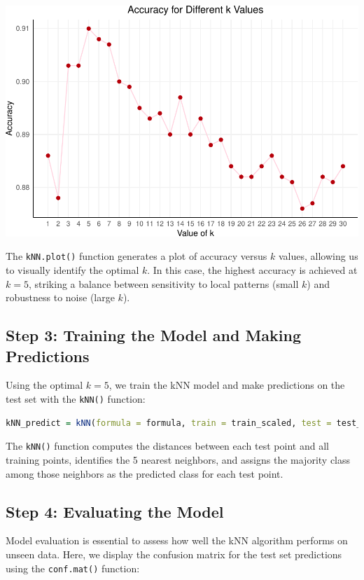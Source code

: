 \documentclass[
]{book}
\newcommand{\passthrough}[1]{#1}
\theoremstyle{definition}
\theoremstyle{definition}
\theoremstyle{definition}
\theoremstyle{definition}
\theoremstyle{remark}
\begin{document}
\begin{center}\includegraphics[width=0.7\linewidth]{knn_files/figure-latex/unnamed-chunk-8-1} \end{center}

The \passthrough{\lstinline!kNN.plot()!} function generates a plot of accuracy versus \(k\) values, allowing us to visually identify the optimal \(k\). In this case, the highest accuracy is achieved at \(k = 5\), striking a balance between sensitivity to local patterns (small \(k\)) and robustness to noise (large \(k\)).

\subsection{Step 3: Training the Model and Making Predictions}\label{step-3-training-the-model-and-making-predictions}

Using the optimal \(k = 5\), we train the kNN model and make predictions on the test set with the \passthrough{\lstinline!kNN()!} function:

\begin{lstlisting}[language=R]
kNN_predict = kNN(formula = formula, train = train_scaled, test = test_scaled, k = 5)
\end{lstlisting}

The \passthrough{\lstinline!kNN()!} function computes the distances between each test point and all training points, identifies the 5 nearest neighbors, and assigns the majority class among those neighbors as the predicted class for each test point.

\subsection{Step 4: Evaluating the Model}\label{step-4-evaluating-the-model}

Model evaluation is essential to assess how well the kNN algorithm performs on unseen data. Here, we display the confusion matrix for the test set predictions using the \passthrough{\lstinline!conf.mat()!} function:
\end{document}
